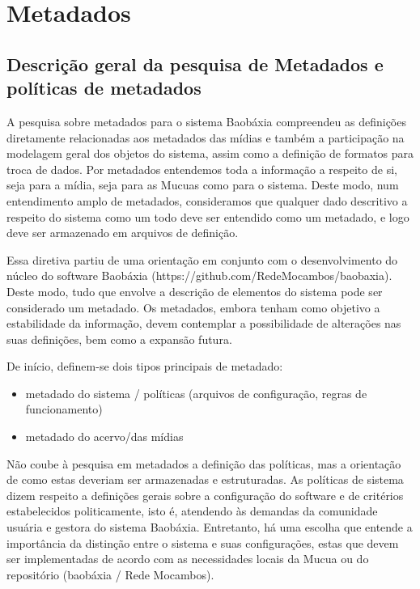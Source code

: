 \label{Metadados}

\chapter{Metadados}

\section{Descrição geral da pesquisa de Metadados e políticas de metadados}

A pesquisa sobre metadados para o sistema Baobáxia compreendeu as
definições diretamente relacionadas aos metadados das mídias e também
a participação na modelagem geral dos objetos do sistema, assim como a
definição de formatos para troca de dados. Por metadados entendemos
toda a informação a respeito de si, seja para a mídia, seja para as
Mucuas como para o sistema. Deste modo, num entendimento amplo de
metadados, consideramos que qualquer dado descritivo a respeito do
sistema como um todo deve ser entendido como um metadado, e logo deve
ser armazenado em arquivos de definição.

Essa diretiva partiu de uma orientação em conjunto com o
desenvolvimento do núcleo do software Baobáxia
(https://github.com/RedeMocambos/baobaxia). Deste modo, tudo que
envolve a descrição de elementos do sistema pode ser considerado um
metadado. Os metadados, embora tenham como objetivo a estabilidade da
informação, devem contemplar a possibilidade de alterações nas suas
definições, bem como a expansão futura.

De início, definem-se dois tipos principais de metadado:
\begin{itemize}
\item metadado do sistema / políticas (arquivos de configuração,
  regras de funcionamento)
\item metadado do acervo/das mídias
\end{itemize}

Não coube à pesquisa em metadados a definição das políticas, mas a
orientação de como estas deveriam ser armazenadas e estruturadas. As
políticas de sistema dizem respeito a definições gerais sobre a
configuração do software e de critérios estabelecidos politicamente,
isto é, atendendo às demandas da comunidade usuária e gestora do
sistema Baobáxia. Entretanto, há uma escolha que entende a importância
da distinção entre o sistema e suas configurações, estas que devem ser
implementadas de acordo com as necessidades locais da Mucua ou do
repositório (baobáxia / Rede Mocambos).

